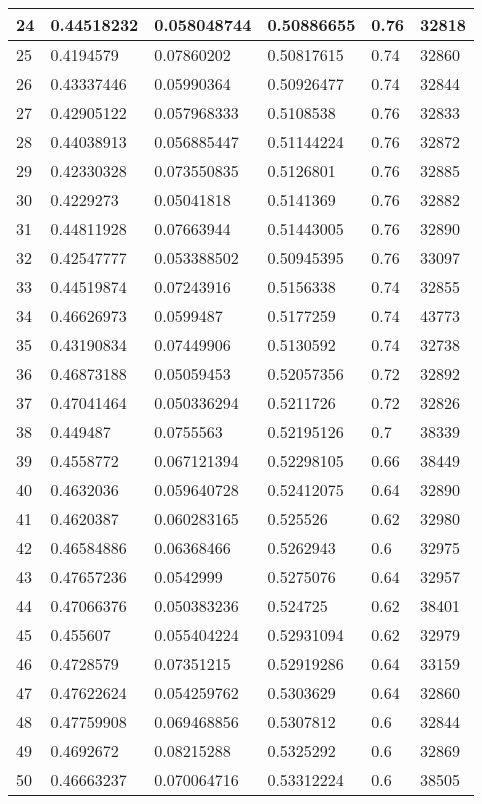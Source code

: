 \begin{longtable}{|l|l|l|l|l|l|}
24 & 0.44518232 & 0.058048744 & 0.50886655 & 0.76 & 32818 \\ \hline 
25 & 0.4194579 & 0.07860202 & 0.50817615 & 0.74 & 32860 \\ \hline 
26 & 0.43337446 & 0.05990364 & 0.50926477 & 0.74 & 32844 \\ \hline 
27 & 0.42905122 & 0.057968333 & 0.5108538 & 0.76 & 32833 \\ \hline 
28 & 0.44038913 & 0.056885447 & 0.51144224 & 0.76 & 32872 \\ \hline 
29 & 0.42330328 & 0.073550835 & 0.5126801 & 0.76 & 32885 \\ \hline 
30 & 0.4229273 & 0.05041818 & 0.5141369 & 0.76 & 32882 \\ \hline 
31 & 0.44811928 & 0.07663944 & 0.51443005 & 0.76 & 32890 \\ \hline 
32 & 0.42547777 & 0.053388502 & 0.50945395 & 0.76 & 33097 \\ \hline 
33 & 0.44519874 & 0.07243916 & 0.5156338 & 0.74 & 32855 \\ \hline 
34 & 0.46626973 & 0.0599487 & 0.5177259 & 0.74 & 43773 \\ \hline 
35 & 0.43190834 & 0.07449906 & 0.5130592 & 0.74 & 32738 \\ \hline 
36 & 0.46873188 & 0.05059453 & 0.52057356 & 0.72 & 32892 \\ \hline 
37 & 0.47041464 & 0.050336294 & 0.5211726 & 0.72 & 32826 \\ \hline 
38 & 0.449487 & 0.0755563 & 0.52195126 & 0.7 & 38339 \\ \hline 
39 & 0.4558772 & 0.067121394 & 0.52298105 & 0.66 & 38449 \\ \hline 
40 & 0.4632036 & 0.059640728 & 0.52412075 & 0.64 & 32890 \\ \hline 
41 & 0.4620387 & 0.060283165 & 0.525526 & 0.62 & 32980 \\ \hline 
42 & 0.46584886 & 0.06368466 & 0.5262943 & 0.6 & 32975 \\ \hline 
43 & 0.47657236 & 0.0542999 & 0.5275076 & 0.64 & 32957 \\ \hline 
44 & 0.47066376 & 0.050383236 & 0.524725 & 0.62 & 38401 \\ \hline 
45 & 0.455607 & 0.055404224 & 0.52931094 & 0.62 & 32979 \\ \hline 
46 & 0.4728579 & 0.07351215 & 0.52919286 & 0.64 & 33159 \\ \hline 
47 & 0.47622624 & 0.054259762 & 0.5303629 & 0.64 & 32860 \\ \hline 
48 & 0.47759908 & 0.069468856 & 0.5307812 & 0.6 & 32844 \\ \hline 
49 & 0.4692672 & 0.08215288 & 0.5325292 & 0.6 & 32869 \\ \hline 
50 & 0.46663237 & 0.070064716 & 0.53312224 & 0.6 & 38505 \\ \hline 
\end{longtable}
